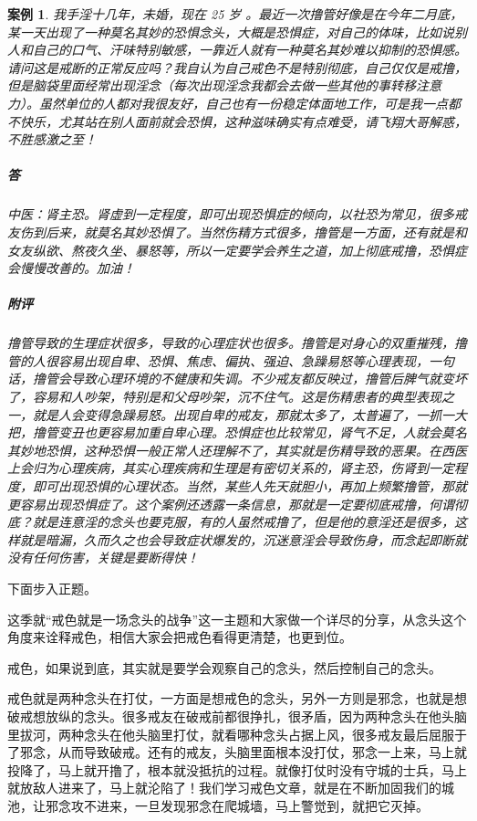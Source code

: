 \documentclass{ctexart}
\newtheorem{case}{案例}
\begin{document}
\begin{case}
    我手淫十几年，未婚，现在 25 岁 。最近一次撸管好像是在今年二月底，某一天出现了一种莫名其妙的恐惧念头，大概是恐惧症，对自己的体味，比如说别人和自己的口气、汗味特别敏感，一靠近人就有一种莫名其妙难以抑制的恐惧感。请问这是戒断的正常反应吗？我自认为自己戒色不是特别彻底，自己仅仅是戒撸，但是脑袋里面经常出现淫念（每次出现淫念我都会去做一些其他的事转移注意力）。虽然单位的人都对我很友好，自己也有一份稳定体面地工作，可是我一点都不快乐，尤其站在别人面前就会恐惧，这种滋味确实有点难受，请飞翔大哥解惑，不胜感激之至！
    \subparagraph{答} 中医：肾主恐。肾虚到一定程度，即可出现恐惧症的倾向，以社恐为常见，很多戒友伤到后来，就莫名其妙恐惧了。当然伤精方式很多，撸管是一方面，还有就是和女友纵欲、熬夜久坐、暴怒等，所以一定要学会养生之道，加上彻底戒撸，恐惧症会慢慢改善的。加油！
    \subparagraph{附评} 撸管导致的生理症状很多，导致的心理症状也很多。撸管是对身心的双重摧残，撸管的人很容易出现自卑、恐惧、焦虑、偏执、强迫、急躁易怒等心理表现，一句话，撸管会导致心理环境的不健康和失调。不少戒友都反映过，撸管后脾气就变坏了，容易和人吵架，特别是和父母吵架，沉不住气。这是伤精患者的典型表现之一，就是人会变得急躁易怒。出现自卑的戒友，那就太多了，太普遍了，一抓一大把，撸管变丑也更容易加重自卑心理。恐惧症也比较常见，肾气不足，人就会莫名其妙地恐惧，这种恐惧一般正常人还理解不了，其实就是伤精导致的恶果。在西医上会归为心理疾病，其实心理疾病和生理是有密切关系的，肾主恐，伤肾到一定程度，即可出现恐惧的心理状态。当然，某些人先天就胆小，再加上频繁撸管，那就更容易出现恐惧症了。这个案例还透露一条信息，那就是一定要彻底戒撸，何谓彻底？就是连意淫的念头也要克服，有的人虽然戒撸了，但是他的意淫还是很多，这样就是暗漏，久而久之也会导致症状爆发的，沉迷意淫会导致伤身，而念起即断就没有任何伤害，关键是要断得快！
\end{case}

下面步入正题。

这季就“戒色就是一场念头的战争”这一主题和大家做一个详尽的分享，从念头这个角度来诠释戒色，相信大家会把戒色看得更清楚，也更到位。

戒色，如果说到底，其实就是要学会观察自己的念头，然后控制自己的念头。

戒色就是两种念头在打仗，一方面是想戒色的念头，另外一方则是邪念，也就是想破戒想放纵的念头。很多戒友在破戒前都很挣扎，很矛盾，因为两种念头在他头脑里拔河，两种念头在他头脑里打仗，就看哪种念头占据上风，很多戒友最后屈服于了邪念，从而导致破戒。还有的戒友，头脑里面根本没打仗，邪念一上来，马上就投降了，马上就开撸了，根本就没抵抗的过程。就像打仗时没有守城的士兵，马上就放敌人进来了，马上就沦陷了！我们学习戒色文章，就是在不断加固我们的城池，让邪念攻不进来，一旦发现邪念在爬城墙，马上警觉到，就把它灭掉。
\end{document}
